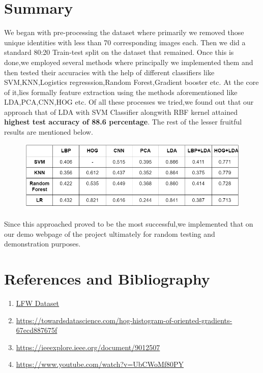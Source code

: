 \documentclass[a4paper]{article}
\theoremstyle{plain}
\theoremstyle{definition}
\begin{document}
 \section{Summary}
	\label{sec:app}
	We began with pre-processing the dataset where primarily we removed those unique identities with less than 70 corresponding images each. Then we did a standard 80:20 Train-test split on the dataset that remained. 
 \newline
 Once this is done,we employed several methods where principally we implemented them and then tested their accuracies with the help of different classifiers like SVM,KNN,Logistics regresssion,Random Forest,Gradient booster etc. At the core of it,lies formally feature extraction using the methods aforementioned like LDA,PCA,CNN,HOG etc. 
 \newline 
 Of all these processes we tried,we found out that our approach that of LDA with SVM Classifier alongwith RBF kernel attained\textbf{ highest test accuracy of 88.6 percentage}. The rest of the lesser fruitful results are mentioned below.
 \begin{figure}[h]
     \centering
     \includegraphics[width=1\linewidth]{image.png}
   
     \label{fig:enter-label}
 \end{figure}
 \newline
 Since this approached proved to be the most successful,we implemented that on our demo webpage of the project ultimately for random testing and demonstration purposes. 
 

\section{ References and Bibliography}
\begin{enumerate}
    \item \href{https://www.kaggle.com/datasets/jessicali9530/lfw-dataset}{\underline {\color{blue}LFW Dataset}}
    \item \href{https://towardsdatascience.com/hog-histogram-of-oriented-gradients-67ecd887675f}{\color{blue}https://towardsdatascience.com/hog-histogram-of-oriented-gradients-67ecd887675f}
    \item \href{https://ieeexplore.ieee.org/document/9012507}{\color{blue}https://ieeexplore.ieee.org/document/9012507}
    \item \href{https://www.youtube.com/watch?v=UbCWoMf80PY}{\color{blue}https://www.youtube.com/watch?v=UbCWoMf80PY}
\end{enumerate}
\end{document}
